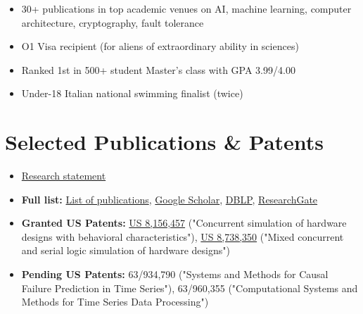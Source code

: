 \documentclass[10pt, letterpaper]{article}
\providecommand{\tightlist}{%
\setlength{\itemsep}{0pt}
\setlength{\parskip}{0pt}}
\begin{document}
  \begin{itemize}
    \tightlist

    \item 30+ publications in top academic venues on AI, machine learning,
      computer architecture, cryptography, fault tolerance

    \item O1 Visa recipient (for aliens of extraordinary ability in
      sciences)

    \item Ranked 1st in 500+ student Master's class with GPA 3.99/4.00

    \item Under-18 Italian national swimming finalist (twice)
  \end{itemize}

  \section{\texorpdfstring{\textbf{Selected Publications \& Patents}}{Selected
  Publications \& Patents}}
  \label{selected-publications-patents}

  \begin{itemize}
    \tightlist

    \item \href{https://gpsaggese.github.io/umd_classes/06_research/}{Research
      statement}

    \item \textbf{Full list:}
      \href{https://gpsaggese.github.io/umd_classes/05_publications/}{List
      of publications}, \href{https://scholar.google.com/scholar?hl=en&as_sdt=0\%2C21&q=gp+saggese&btnG=}{Google
      Scholar},
      \href{https://dblp.uni-trier.de/pers/hd/s/Saggese:Giacinto_Paolo}{DBLP},
      \href{https://www.researchgate.net/scientific-contributions/70377865_GP_Saggese}{ResearchGate}

    \item \textbf{Granted US Patents:}
      \href{https://patents.google.com/patent/US8156457B2/en}{US 8,156,457}
      ("Concurrent simulation of hardware designs with behavioral
      characteristics"), \href{https://patents.google.com/patent/US8738350B2/en}{US
      8,738,350} ("Mixed concurrent and serial logic simulation of hardware
      designs")

    \item \textbf{Pending US Patents:} 63/934,790 ("Systems and Methods
      for Causal Failure Prediction in Time Series"), 63/960,355 ("Computational
      Systems and Methods for Time Series Data Processing")
  \end{itemize}
\end{document}
